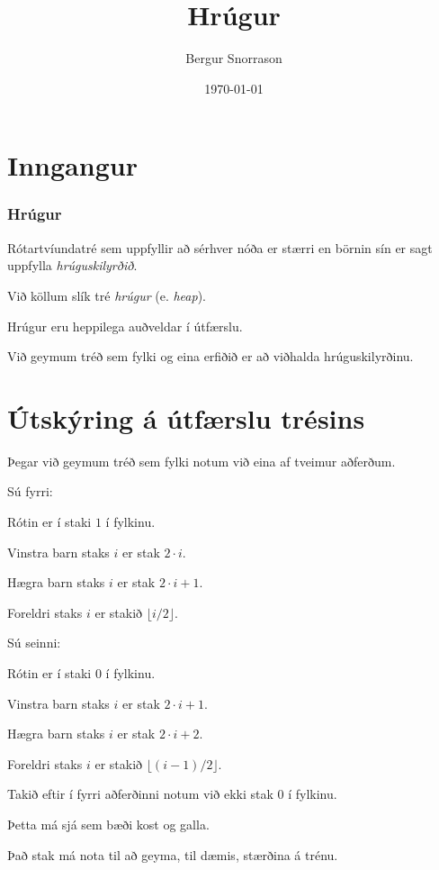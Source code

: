 \title{Hrúgur}
\author{Bergur Snorrason}
\date{\today}



\frame{\titlepage}

\section{Inngangur}
{
	\frametitle{Hrúgur}
	{
		\item<1-> Rótartvíundatré sem uppfyllir að sérhver nóða er stærri en börnin sín er sagt uppfylla \emph{hrúguskilyrðið}.
		\item<2-> Við köllum slík tré \emph{hrúgur} (e. \emph{heap}).
		\item<3-> Hrúgur eru heppilega auðveldar í útfærslu.
		\item<4-> Við geymum tréð sem fylki og eina erfiðið er að viðhalda hrúguskilyrðinu.
	}
}

\section{Útskýring á útfærslu trésins}
{
	{
		\item<1-> Þegar við geymum tréð sem fylki notum við eina af tveimur aðferðum.
		\item<2-> Sú fyrri:
		{
			\item<3-> Rótin er í staki $1$ í fylkinu.
			\item<4-> Vinstra barn staks $i$ er stak $2 \cdot i$.
			\item<5-> Hægra barn staks $i$ er stak $2 \cdot i + 1$.
			\item<6-> Foreldri staks $i$ er stakið $\lfloor i/2 \rfloor$.
		}
		\item<7-> Sú seinni:
		{
			\item<8-> Rótin er í staki $0$ í fylkinu.
			\item<9-> Vinstra barn staks $i$ er stak $2\cdot i + 1$.
			\item<10-> Hægra barn staks $i$ er stak $2\cdot i + 2$.
			\item<11-> Foreldri staks $i$ er stakið $\lfloor (i - 1)/2 \rfloor$.
		}
		\item<12-> Takið eftir í fyrri aðferðinni notum við ekki stak $0$ í fylkinu.
		\item<13-> Þetta má sjá sem bæði kost og galla.
		\item<14-> Það stak má nota til að geyma, til dæmis, stærðina á trénu.
	}
}

